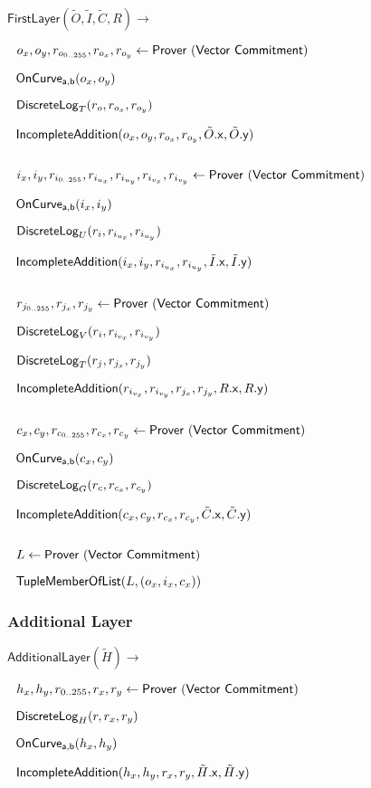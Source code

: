 \documentclass[]{article}
\begin{document}
$\mathsf{FirstLayer}(\tilde{O}, \tilde{I}, \tilde{C}, R) \rightarrow$

$~~o_x, o_y, r_{o_{0..255}}, r_{o_x}, r_{o_y}\leftarrow \mathsf{Prover ~(Vector ~Commitment)}$

$~~\mathsf{OnCurve_{a,b}}(o_x, o_y)$

$~~\mathsf{DiscreteLog}_T(r_o, r_{o_x}, r_{o_y})$

$~~\mathsf{IncompleteAddition}(o_x, o_y, r_{o_x}, r_{o_y}, \tilde{O}\mathsf{.x}, \tilde{O}\mathsf{.y})$

$ $

$~~i_x, i_y, r_{i_{0..255}}, r_{i_{u_x}}, r_{i_{u_y}}, r_{i_{v_x}}, r_{i_{v_y}}\leftarrow \mathsf{Prover ~(Vector ~Commitment)}$

$~~\mathsf{OnCurve_{a,b}}(i_x, i_y)$

$~~\mathsf{DiscreteLog}_U(r_i, r_{i_{u_x}}, r_{i_{u_y}})$

$~~\mathsf{IncompleteAddition}(i_x, i_y, r_{i_{u_x}}, r_{i_{u_y}}, \tilde{I}\mathsf{.x}, \tilde{I}\mathsf{.y})$

$ $

$~~r_{j_{0..255}}, r_{j_x}, r_{j_y}\leftarrow \mathsf{Prover ~(Vector ~Commitment)}$

$~~\mathsf{DiscreteLog}_V(r_i, r_{i_{v_x}}, r_{i_{v_y}})$

$~~\mathsf{DiscreteLog}_T(r_j, r_{j_x}, r_{j_y})$

$~~\mathsf{IncompleteAddition}(r_{i_{v_x}}, r_{i_{v_y}}, r_{j_x}, r_{j_y}, R\mathsf{.x}, R\mathsf{.y})$

$ $

$~~c_x, c_y, r_{c_{0..255}}, r_{c_x}, r_{c_y}\leftarrow \mathsf{Prover ~(Vector ~Commitment)}$

$~~\mathsf{OnCurve_{a,b}}(c_x, c_y)$

$~~\mathsf{DiscreteLog}_G(r_c, r_{c_x}, r_{c_y})$

$~~\mathsf{IncompleteAddition}(c_x, c_y, r_{c_x}, r_{c_y}, \tilde{C}\mathsf{.x}, \tilde{C}\mathsf{.y})$

$ $

$~~L\leftarrow \mathsf{Prover ~(Vector ~Commitment)}$

$~~\mathsf{TupleMemberOfList}(L, (o_x, i_x, c_x))$

\subsubsection{Additional Layer}

$\mathsf{AdditionalLayer}(\tilde{H}) \rightarrow$

$~~h_x, h_y, r_{0..255}, r_x, r_y\leftarrow \mathsf{Prover ~(Vector ~Commitment)}$

$~~\mathsf{DiscreteLog}_H(r, r_x, r_y)$

$~~\mathsf{OnCurve_{a,b}}(h_x, h_y)$

$~~\mathsf{IncompleteAddition}(h_x, h_y, r_x, r_y, \tilde{H}\mathsf{.x}, \tilde{H}\mathsf{.y})$
\end{document}
